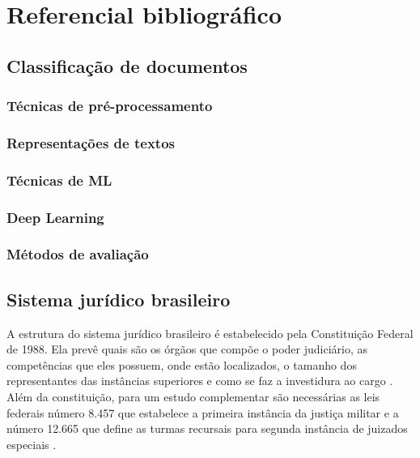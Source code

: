 \chapter[Referêncial bibliográfico]{Referencial bibliográfico}

\section{Classificação de documentos}
\subsection{Técnicas de pré-processamento}
\subsection{Representações de textos}
\subsection{Técnicas de ML}
\subsection{Deep Learning}
\subsection{Métodos de avaliação}

\section{Sistema jurídico brasileiro}

A estrutura do sistema jurídico brasileiro é estabelecido pela Constituição Federal de 1988. Ela prevê quais são os órgãos que compõe o poder judiciário, as competências que eles possuem, onde estão localizados, o tamanho dos representantes das instâncias superiores e como se faz a investidura ao cargo \cite{BRASIL1988}. Além da constituição, para um estudo complementar são necessárias as leis federais número 8.457 que estabelece a primeira instância da justiça militar \cite{BRASIL1992} e a número 12.665 que define as turmas recursais para segunda instância de juizados especiais \cite{BRASIL2012}.


